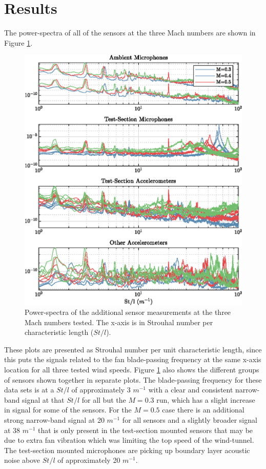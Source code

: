 \section{Results}
The power-spectra of all of the sensors at the three Mach numbers are shown in Figure \ref{fig:07_sensor_spectra}.
\begin{figure}
  \centering
  \includegraphics{../matlab/07_multiple_sensor_filtering/sensor_spectra.eps}
  \caption{Power-spectra of the additional sensor measurements at the three Mach numbers tested. The x-axis is in Strouhal number per characteristic length ($St/l$).}
  \label{fig:07_sensor_spectra}
\end{figure}
These plots are presented as Strouhal number per unit characteristic length, since this puts the signals related to the fan blade-passing frequency at the same x-axis location for all three tested wind speeds.
Figure \ref{fig:07_sensor_spectra} also shows the different groups of sensors shown together in separate plots.
The blade-passing frequency for these data sets is at a $St/l$ of approximately 3 $m^{-1}$ with a clear and consistent narrow-band signal at that $St/l$ for all but the $M=0.3$ run, which has a slight increase in signal for some of the sensors.
For the $M=0.5$ case there is an additional strong narrow-band signal at 20 $m^{-1}$ for all sensors and a slightly broader signal at 38 $m^{-1}$ that is only present in the test-section mounted sensors that may be due to extra fan vibration which was limiting the top speed of the wind-tunnel.
The test-section mounted microphones are picking up boundary layer acoustic noise above $St/l$ of approximately 20 $m^{-1}$.

